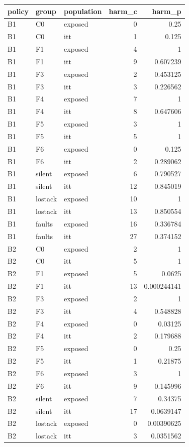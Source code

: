 \begin{tabular}{lllrr}
\toprule
policy & group & population & harm\_c & harm\_p \\
\midrule
B1 & C0 & exposed & 0 & 0.25 \\
B1 & C0 & itt & 1 & 0.125 \\
B1 & F1 & exposed & 4 & 1 \\
B1 & F1 & itt & 9 & 0.607239 \\
B1 & F3 & exposed & 2 & 0.453125 \\
B1 & F3 & itt & 3 & 0.226562 \\
B1 & F4 & exposed & 7 & 1 \\
B1 & F4 & itt & 8 & 0.647606 \\
B1 & F5 & exposed & 3 & 1 \\
B1 & F5 & itt & 5 & 1 \\
B1 & F6 & exposed & 0 & 0.125 \\
B1 & F6 & itt & 2 & 0.289062 \\
B1 & silent & exposed & 6 & 0.790527 \\
B1 & silent & itt & 12 & 0.845019 \\
B1 & lostack & exposed & 10 & 1 \\
B1 & lostack & itt & 13 & 0.850554 \\
B1 & faults & exposed & 16 & 0.336784 \\
B1 & faults & itt & 27 & 0.374152 \\
B2 & C0 & exposed & 2 & 1 \\
B2 & C0 & itt & 5 & 1 \\
B2 & F1 & exposed & 5 & 0.0625 \\
B2 & F1 & itt & 13 & 0.000244141 \\
B2 & F3 & exposed & 2 & 1 \\
B2 & F3 & itt & 4 & 0.548828 \\
B2 & F4 & exposed & 0 & 0.03125 \\
B2 & F4 & itt & 2 & 0.179688 \\
B2 & F5 & exposed & 0 & 0.25 \\
B2 & F5 & itt & 1 & 0.21875 \\
B2 & F6 & exposed & 3 & 1 \\
B2 & F6 & itt & 9 & 0.145996 \\
B2 & silent & exposed & 7 & 0.34375 \\
B2 & silent & itt & 17 & 0.0639147 \\
B2 & lostack & exposed & 0 & 0.00390625 \\
B2 & lostack & itt & 3 & 0.0351562 \\

\end{tabular}
